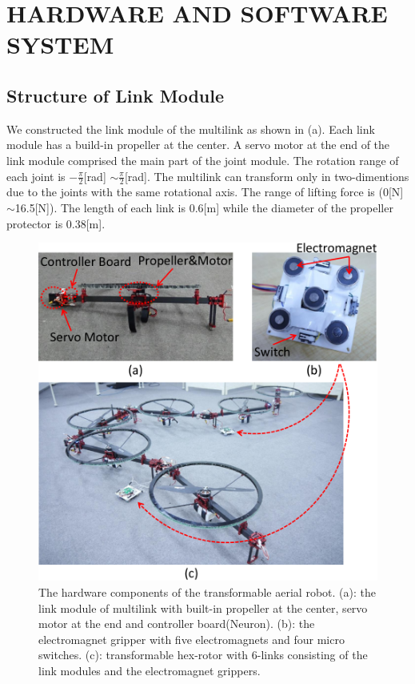 \section{HARDWARE AND SOFTWARE SYSTEM}
\subsection{Structure of Link Module}
We constructed the link module of the multilink as shown in (a). Each link module has a build-in propeller at the center. A servo motor at the end of the link module comprised the main part of the joint module. The rotation range of each joint is $-\frac{\pi}{2}$[rad] $\sim \frac{\pi}{2}$[rad]. The multilink can transform only in two-dimentions due to the joints with the same rotational axis. The range of lifting force is (0[N]$\sim$16.5[N]). The length of each link is 0.6[m] while the diameter of the propeller protector is 0.38[m]. 
 \begin{figure}[t]
  \begin{center}
    \includegraphics[width=1.0\columnwidth]{figs/hardware.pdf}
  \end{center}
  \caption{The hardware components of the transformable aerial robot. (a): the link module of multilink with built-in propeller at the center, servo motor at the end and controller board(Neuron). (b): the electromagnet gripper with five electromagnets and four micro switches. (c): transformable hex-rotor with 6-links consisting of the link modules and the electromagnet grippers. \label{figure:hardware}}
\end{figure}


